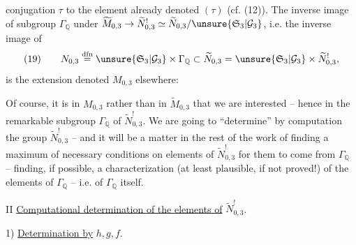
conjugation $\tau$ to the element already denoted $(\tau)$ (cf. (12)). The inverse image of  subgroup $\Gamma_{\mathbb Q}$  under $\widetilde M_{0,3}\to\widetilde N_{0,3}^{!}\simeq\widetilde N_{0,3}/\unsure{\mathfrak S_3|\mathcal G_3}$, i.e. the inverse image of 
\[
(19)\qquad
N_{0,3}\overset{\mathrm{dfn}}{=}
\unsure{\mathfrak S_3|\mathcal G_3}\times\Gamma_{\mathbb Q}
\subset\widetilde N_{0,3}
=\unsure{\mathfrak S_3|\mathcal G_3}\times\widetilde N_{0,3}^{!},
\]
is the extension  denoted $M_{0,3}$ elsewhere:



Of course, it is in $M_{0,3}$  rather than in $\widetilde M_{0,3}$  that we are interested -- hence in the remarkable subgroup $\Gamma_{\mathbb Q}$ of $\widetilde N_{0,3}^{!}$. We are going to ``determine'' by computation the group $\widetilde N_{0,3}^{!}$ -- and it will be a matter in the rest of the work of finding a maximum of necessary conditions on elements of $\widetilde N_{0,3}^{!}$ for them to come from $\Gamma_{\mathbb Q}$ --  finding, if possible, a characterization (at least plausible, if not proved!) of the elements of $\Gamma_{\mathbb Q}$ -- i.e. of $\Gamma_{\mathbb Q}$ itself.


II \uline{Computational determination of the elements of} $\widetilde N_{0,3}^{!}$.

1) \uline{Determination by} $h,g,f$.


